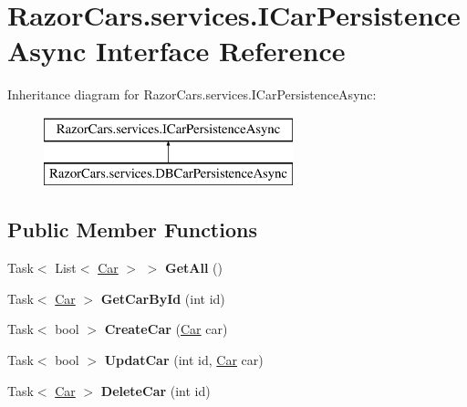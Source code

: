 \hypertarget{interface_razor_cars_1_1services_1_1_i_car_persistence_async}{}\section{Razor\+Cars.\+services.\+I\+Car\+Persistence\+Async Interface Reference}
\label{interface_razor_cars_1_1services_1_1_i_car_persistence_async}
Inheritance diagram for Razor\+Cars.\+services.\+I\+Car\+Persistence\+Async\+:\begin{figure}[H]
\begin{center}
\leavevmode
\includegraphics[height=2.000000cm]{interface_razor_cars_1_1services_1_1_i_car_persistence_async}
\end{center}
\end{figure}
\subsection*{Public Member Functions}
\begin{DoxyCompactItemize}
\item 
\mbox{\label{interface_razor_cars_1_1services_1_1_i_car_persistence_async_a57c520e9ea23a149bf263305a1f1e53c}} 
Task$<$ List$<$ \mbox{\hyperlink{class_razor_cars_1_1model_1_1_car}{Car}} $>$ $>$ {\bfseries Get\+All} ()
\item 
\mbox{\label{interface_razor_cars_1_1services_1_1_i_car_persistence_async_af38b7f7db05b6eff89871636cab0ad22}} 
Task$<$ \mbox{\hyperlink{class_razor_cars_1_1model_1_1_car}{Car}} $>$ {\bfseries Get\+Car\+By\+Id} (int id)
\item 
\mbox{\label{interface_razor_cars_1_1services_1_1_i_car_persistence_async_acb45ca73de95348339a069cc6024fbd5}} 
Task$<$ bool $>$ {\bfseries Create\+Car} (\mbox{\hyperlink{class_razor_cars_1_1model_1_1_car}{Car}} car)
\item 
\mbox{\label{interface_razor_cars_1_1services_1_1_i_car_persistence_async_a81ac68d9bd2bf917d9324f59b7680796}} 
Task$<$ bool $>$ {\bfseries Updat\+Car} (int id, \mbox{\hyperlink{class_razor_cars_1_1model_1_1_car}{Car}} car)
\item 
\mbox{\label{interface_razor_cars_1_1services_1_1_i_car_persistence_async_a7d2c100d0d3f28412e566f18a81d2c5f}} 
Task$<$ \mbox{\hyperlink{class_razor_cars_1_1model_1_1_car}{Car}} $>$ {\bfseries Delete\+Car} (int id)
\end{DoxyCompactItemize}


